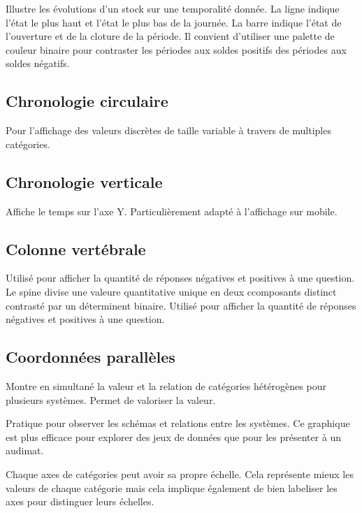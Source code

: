 \documentclass[a4paper,12pt]{article}
\begin{document}
\begin{multicols}{2}
Illustre les évolutions d'un stock sur une temporalité donnée. La ligne indique l'état le plus haut et l'état le plus bas de la journée. La barre indique l'état de l'ouverture et de la cloture de la période. \autocite{jonathanschwabishDistribution2021} Il convient d'utiliser une palette de couleur binaire pour contraster les périodes aux soldes positifs des périodes aux soldes négatifs.
\subsection*{Chronologie circulaire}
\label{sec:org61eac41}
Pour l'affichage des valeurs discrètes de taille variable à travers de multiples catégories. \autocite{alansmithLexiqueVisuel}
\subsection*{Chronologie verticale}
\label{sec:orgfeecb34}
Affiche le temps sur l'axe Y. Particulièrement adapté à l'affichage sur mobile. \autocite{alansmithLexiqueVisuel}
\subsection*{Colonne vertébrale}
\label{sec:orge6fd4a0}
Utilisé pour afficher la quantité de réponses négatives et positives à une question. Le spine divise une valeure quantitative unique en deux ccomposants distinct contrasté par un déterminent binaire. \autocite{alansmithLexiqueVisuel} Utilisé pour afficher la quantité de réponses négatives et positives à une question.
\subsection*{Coordonnées parallèles}
\label{sec:orgbc621df}
Montre en simultané la valeur et la relation de catégories hétérogènes pour plusieurs systèmes. \autocite{jonathanschwabishRelationship2021} Permet de valoriser la valeur. \autocite{alansmithLexiqueVisuel}

Pratique pour observer les schémas et relations entre les systèmes. \autocite{mikeyiHowChooseRight2020} Ce graphique est plus efficace pour explorer des jeux de données que pour les présenter à un audimat. \autocite{sosulskiGraphics2019}

Chaque axes de catégories peut avoir sa propre échelle. Cela représente mieux les valeurs de chaque catégorie mais cela implique également de bien labeliser les axes pour distinguer leurs échelles. \autocite{jonathanschwabishRelationship2021}


\end{multicols}
\end{document}
